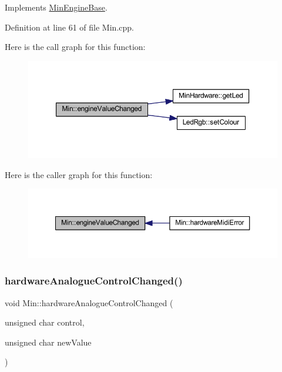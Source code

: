 Implements \hyperlink{class_min_engine_base_a35b19eb25b2bbfbcf0bc2262a63ec488}{Min\+Engine\+Base}.



Definition at line 61 of file Min.\+cpp.

Here is the call graph for this function\+:
\nopagebreak
\begin{figure}[H]
\begin{center}
\leavevmode
\includegraphics[width=350pt]{dd/d34/class_min_a9fe42a8d40c06d73556cf6d0dac2dc71_cgraph}
\end{center}
\end{figure}
Here is the caller graph for this function\+:
\nopagebreak
\begin{figure}[H]
\begin{center}
\leavevmode
\includegraphics[width=350pt]{dd/d34/class_min_a9fe42a8d40c06d73556cf6d0dac2dc71_icgraph}
\end{center}
\end{figure}
\mbox{\label{class_min_aead3e428133f75538420c1e67c532fa7}} 
\subsubsection{\texorpdfstring{hardware\+Analogue\+Control\+Changed()}{hardwareAnalogueControlChanged()}}
{\footnotesize\ttfamily void Min\+::hardware\+Analogue\+Control\+Changed (\begin{DoxyParamCaption}\item[{unsigned char}]{control,  }\item[{unsigned char}]{new\+Value }\end{DoxyParamCaption})\hspace{0.3cm}{\ttfamily [virtual]}}



